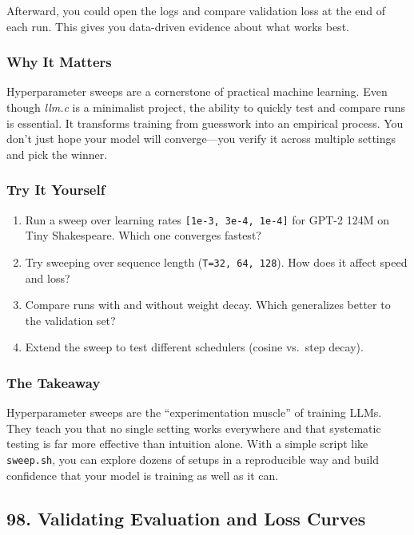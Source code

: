\documentclass[
  letterpaper,
  DIV=11,
  numbers=noendperiod]{scrreprt}
\providecommand{\tightlist}{%
  \setlength{\itemsep}{0pt}\setlength{\parskip}{0pt}}
\begin{document}
Afterward, you could open the logs and compare validation loss at the
end of each run. This gives you data-driven evidence about what works
best.

\subsubsection{Why It Matters}\label{why-it-matters-71}

Hyperparameter sweeps are a cornerstone of practical machine learning.
Even though \emph{llm.c} is a minimalist project, the ability to quickly
test and compare runs is essential. It transforms training from
guesswork into an empirical process. You don't just hope your model will
converge---you verify it across multiple settings and pick the winner.

\subsubsection{Try It Yourself}\label{try-it-yourself-85}

\begin{enumerate}
\def\labelenumi{\arabic{enumi}.}
\tightlist
\item
  Run a sweep over learning rates \texttt{{[}1e-3,\ 3e-4,\ 1e-4{]}} for
  GPT-2 124M on Tiny Shakespeare. Which one converges fastest?
\item
  Try sweeping over sequence length (\texttt{T=32,\ 64,\ 128}). How does
  it affect speed and loss?
\item
  Compare runs with and without weight decay. Which generalizes better
  to the validation set?
\item
  Extend the sweep to test different schedulers (cosine vs.~step decay).
\end{enumerate}

\subsubsection{The Takeaway}\label{the-takeaway-86}

Hyperparameter sweeps are the ``experimentation muscle'' of training
LLMs. They teach you that no single setting works everywhere and that
systematic testing is far more effective than intuition alone. With a
simple script like \texttt{sweep.sh}, you can explore dozens of setups
in a reproducible way and build confidence that your model is training
as well as it can.

\subsection{98. Validating Evaluation and Loss
Curves}\label{validating-evaluation-and-loss-curves}
\end{document}
